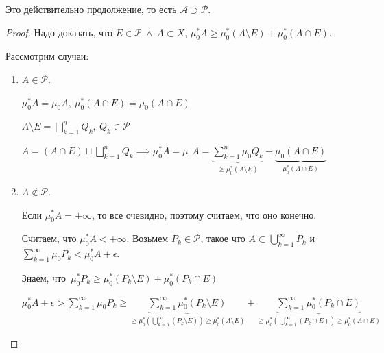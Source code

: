 \begin{theorem}
    Это действительно продолжение, то есть $\mathcal{A} \supset \mathcal{P}$.
\end{theorem}
\begin{proof}
    Надо доказать, что $E \in \mathcal{P} \ \land \ A \subset X$, $\mu^*_0 A \geq \mu^*_0 (A \setminus E) + \mu^*_0 (A \cap E)$.

    Рассмотрим случаи:
    \begin{enumerate}
        \item {
            $A \in \mathcal{P}$.

            $\mu^*_0 A = \mu_0 A, \ \mu^*_0 (A \cap E) = \mu_0 (A \cap E)$

            $A \setminus E = \bigsqcup_{k=1}^{n} Q_k, \ Q_k \in \mathcal{P}$

            $A = (A \cap E) \sqcup \bigsqcup_{k=1}^{n} Q_k \implies \mu^*_0 A = \mu_0 A = \underbrace{\sum_{k=1}^{n} \mu_0 Q_k}_{\geq \mu^*_0 (A \setminus E)} + \underbrace{\mu_0 (A \cap E)}_{\mu^*_0 (A \cap E)}$
        }
        \item {
            $A \notin \mathcal{P}$.

            Если $\mu^*_0A = +\infty$, то все очевидно, поэтому считаем, что оно конечно.

            Считаем, что $\mu^*_0 A < +\infty$. Возьмем $P_k \in \mathcal{P}$, такое что $A \subset \bigcup_{k=1}^{\infty} P_k$ и $\sum_{k=1}^{\infty} \mu_0 P_k < \mu^*_0 A + \epsilon$.

            Знаем, что $\mu^*_0 P_k \geq \mu^*_0 (P_k \setminus E) + \mu^*_0 (P_k \cap E)$

            $\mu^*_0 A + \epsilon > \sum_{k=1}^{\infty} \mu_0 P_k \geq \underbrace{\sum_{k=1}^{\infty} \mu^*_0 (P_k \setminus E)}_{\geq \mu^*_0 (\bigcup_{k=1}^{\infty} (P_k \setminus E)) \geq \mu^*_0 (A \setminus E)} + \underbrace{\sum_{k=1}^{\infty} \mu^*_0 (P_k \cap E)}_{\geq \mu^*_0 (\bigcup_{k=1}^{\infty} (P_k \cap E)) \geq \mu^*_0 (A \cap E)}$
        }
    \end{enumerate}
\end{proof}

